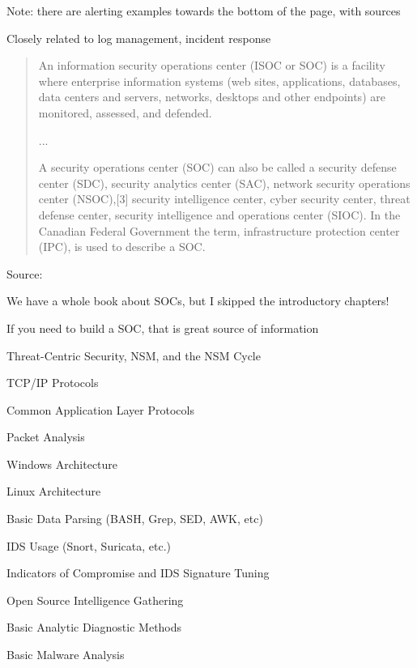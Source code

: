 \documentclass[Screen16to9,17pt]{foils}
\begin{document}
\begin{list2}
  \item Note: there are alerting examples towards the bottom of the page, with sources
  \item Closely related to log management, incident response
\end{list2}






\begin{quote}
An information security operations center (ISOC or SOC) is a facility where enterprise information systems (web sites, applications, databases, data centers and servers, networks, desktops and other endpoints) are monitored, assessed, and defended.

...

A security operations center (SOC) can also be called a security defense center (SDC), security analytics center (SAC), network security operations center (NSOC),[3] security intelligence center, cyber security center, threat defense center, security intelligence and operations center (SIOC). In the Canadian Federal Government the term, infrastructure protection center (IPC), is used to describe a SOC.
\end{quote}
Source: 

\begin{list2}
  \item We have a whole book about SOCs, but I skipped the introductory chapters!
  \item If you need to build a SOC, that is great source of information
\end{list2}


\begin{list2}\small
\item Threat-Centric Security, NSM, and the NSM Cycle
\item TCP/IP Protocols
\item Common Application Layer Protocols
\item Packet Analysis
\item Windows Architecture
\item Linux Architecture
\item Basic Data Parsing (BASH, Grep, SED, AWK, etc)
\item IDS Usage (Snort, Suricata, etc.)
\item Indicators of Compromise and IDS Signature Tuning
\item Open Source Intelligence Gathering
\item Basic Analytic Diagnostic Methods
\item Basic Malware Analysis
\end{list2}
\end{document}
